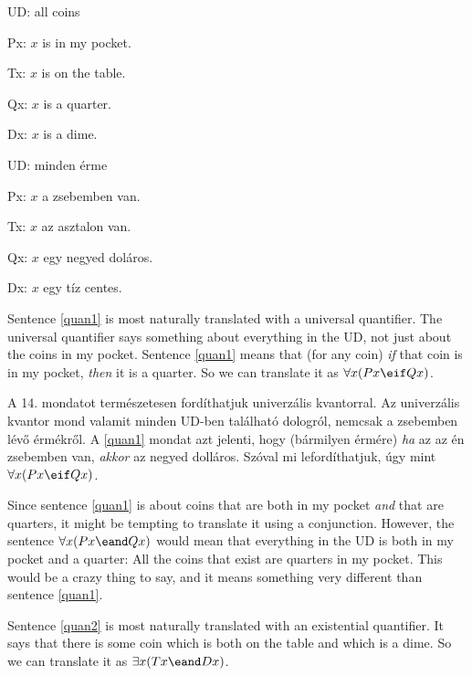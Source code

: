 \begin{ekey}
\item[UD:] all coins
\item[Px:] $x$ is in my pocket.
\item[Tx:] $x$ is on the table.
\item[Qx:] $x$ is a quarter.
\item[Dx:] $x$ is a dime.
\end{ekey}

\begin{ekey}
\item[UD:] minden érme
\item[Px:] $x$ a zsebemben van.
\item[Tx:] $x$ az asztalon van.
\item[Qx:] $x$ egy negyed doláros.
\item[Dx:] $x$ egy tíz centes.
\end{ekey}

Sentence \ref{quan1} is most naturally translated with a universal quantifier. The universal quantifier says something about everything in the UD, not just about the coins in my pocket. Sentence \ref{quan1} means that (for any coin) \emph{if} that coin is in my pocket, \emph{then} it is a quarter. So we can translate it as $\forall x(Px \eif Qx)$.

A 14. mondatot természetesen fordíthatjuk univerzális kvantorral. Az univerzális kvantor mond valamit minden UD-ben található dologról, nemcsak a zsebemben lévő érmékről.
A \ref{quan1} mondat azt jelenti, hogy (bármilyen érmére) \emph{ha} az az én zsebemben van, \emph{akkor} az negyed dolláros. Szóval mi lefordíthatjuk, úgy mint $\forall x(Px \eif Qx)$.

	


Since sentence \ref{quan1} is about coins that are both in my pocket \emph{and} that are quarters, it might be tempting to translate it using a conjunction. However, the sentence $\forall x(Px \eand Qx)$ would mean that everything in the UD is both in my pocket and a quarter: All the coins that exist are quarters in my pocket. This would be a crazy thing to say, and it means something very different than sentence \ref{quan1}.

Sentence \ref{quan2} is most naturally translated with an existential quantifier. It says that there is some coin which is both on the table and which is a dime. So we can translate it as $\exists x(Tx \eand Dx)$.

